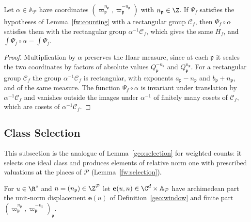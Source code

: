 \begin{lemma}\label{fw:rescaling}
Let $\alpha\in\mathbb A_{\mathcal P}$ have coordinates
$(\varpi_{\mathfrak p}^{n_{\mathfrak p}},\varpi_{\mathfrak
p}^{-n_{\mathfrak p}})$ with $n_{\mathfrak p}\in\Z$. If $\Psi_f$ satisfies the
hypotheses of Lemma~\ref{fw:counting} with a rectangular group $\mathcal
C_f$, then $\Psi_f\circ\alpha$ satisfies them with the rectangular group
$\alpha^{-1}\mathcal C_f$, which gives the same $H_f$, and
$\int\Psi_f\circ\alpha=\int\Psi_f$.
\end{lemma}

\begin{proof}
Multiplication by $\alpha$ preserves the Haar measure, since at each
$\mathfrak p$ it scales the two coordinates by factors of absolute values
$Q_{\mathfrak p}^{-n_{\mathfrak p}}$ and $Q_{\mathfrak p}^{n_{\mathfrak p}}$.
For a rectangular group $\mathcal C_f$ the group $\alpha^{-1}\mathcal C_f$ is
rectangular, with exponents $a_{\mathfrak p}-n_{\mathfrak p}$ and
$b_{\mathfrak p}+n_{\mathfrak p}$, and of the same measure. The function
$\Psi_f\circ\alpha$ is invariant under translation by $\alpha^{-1}\mathcal
C_f$ and vanishes outside the images under $\alpha^{-1}$ of finitely many
cosets of $\mathcal C_f$, which are cosets of $\alpha^{-1}\mathcal C_f$.
\end{proof}

\subsection{Class Selection}

This subsection is the analogue of Lemma~\ref{geo:selection} for weighted
counts: it selects one ideal class and produces elements of relative norm one
with prescribed valuations at the places of $\mathcal P$
(Lemma~\ref{fw:selection}).

For $u\in\R^c$ and $n=(n_{\mathfrak p})\in\Z^{\mathcal P}$ let
$\mathbf e(u,n)\in\C^d\times\mathbb A_{\mathcal P}$ have archimedean part
the unit-norm displacement $\mathbf e(u)$ of Definition~\ref{geo:window} and
finite part $(\varpi_{\mathfrak p}^{n_{\mathfrak
p}},\varpi_{\mathfrak p}^{-n_{\mathfrak p}})_{\mathfrak p}$.

